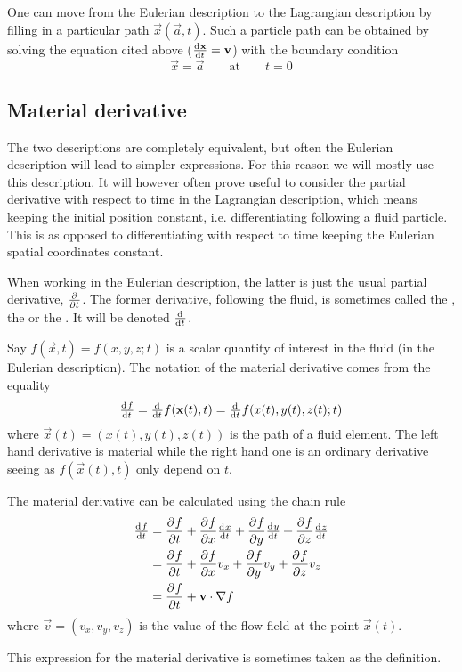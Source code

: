One can move from the Eulerian description to the Lagrangian description by filling in a particular path $\vec{x}(\vec{a},t)$. Such a particle path can be obtained by solving the equation cited above ($\od{\vec{x}}{t} = \vec{v}$) with the boundary condition
\[ \vec{x} = \vec{a} \qquad \text{at} \qquad t=0 \]

\subsection{Material derivative}
The two descriptions are completely equivalent, but often the Eulerian description will lead to simpler expressions. For this reason we will mostly use this description. It will however often prove useful to consider the partial derivative with respect to time in the Lagrangian description, which means keeping the initial position constant, i.e. differentiating following a fluid particle. This is as opposed to differentiating with respect to time keeping the Eulerian spatial coordinates constant.

When working in the Eulerian description, the latter is just the usual partial derivative, $ \frac{\partial{^{}}}{\partial{{t}^{}}} $. The former derivative, following the fluid, is sometimes called the , the  or the . It will be denoted $\od{}{t}$.

Say $f(\vec{x},t) = f(x,y,z;t)$ is a scalar quantity of interest in the fluid (in the Eulerian description). The notation of the material derivative comes from the equality
\[ \od{f}{t} = \od{}{t}f(\vec{x}(t), t) = \od{}{t}f(x(t), y(t), z(t);t)\]
where $\vec{x}(t) = (x(t), y(t), z(t))$ is the path of a fluid element. The left hand derivative is material while the right hand one is an ordinary derivative seeing as $f(\vec{x}(t), t)$ only depend on $t$.

The material derivative can be calculated using the chain rule
\begin{align*}
\od{f}{t} &= \pd{f}{t} + \pd{f}{x}\od{x}{t} + \pd{f}{y}\od{y}{t} + \pd{f}{z}\od{z}{t} \\
&= \pd{f}{t} + \pd{f}{x}v_x + \pd{f}{y}v_y + \pd{f}{z}v_z \\
&= \pd{f}{t} + \vec{v}\cdot \grad f
\end{align*}
where $\vec{v} = (v_x, v_y, v_z)$ is the value of the flow field at the point $\vec{x}(t)$.

This expression for the material derivative is sometimes taken as the definition.

